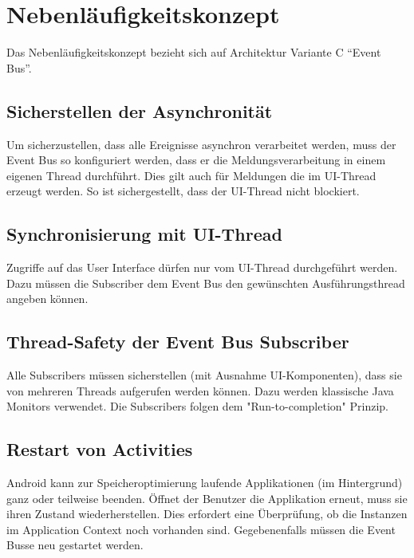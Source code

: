 \section{Nebenläufigkeitskonzept}
\label{sec:Nebenläufigkeitskonzept}
Das Nebenläufigkeitskonzept bezieht sich auf Architektur Variante C \enquote{Event Bus}.

\subsection{Sicherstellen der Asynchronität}
Um sicherzustellen, dass alle Ereignisse asynchron verarbeitet werden, muss der Event Bus so konfiguriert werden, dass er die Meldungsverarbeitung in einem eigenen Thread durchführt. Dies gilt auch für Meldungen die im \ac{UI}-Thread erzeugt werden. So ist sichergestellt, dass der \ac{UI}-Thread nicht blockiert.

\subsection{Synchronisierung mit \ac{UI}-Thread}
Zugriffe auf das User Interface dürfen nur vom UI-Thread durchgeführt werden. Dazu müssen die Subscriber dem Event Bus den gewünschten Ausführungsthread angeben können.

\subsection{Thread-Safety der Event Bus Subscriber}
Alle Subscribers müssen sicherstellen (mit Ausnahme UI-Komponenten), dass sie von mehreren Threads aufgerufen werden können. Dazu werden klassische Java Monitors verwendet. Die Subscribers folgen dem "Run-to-completion" Prinzip.

\subsection{Restart von Activities}
Android kann zur Speicheroptimierung laufende Applikationen (im Hintergrund) ganz oder teilweise beenden. Öffnet der Benutzer die Applikation erneut, muss sie ihren Zustand wiederherstellen. Dies erfordert eine Überprüfung, ob die Instanzen im Application Context noch vorhanden sind. Gegebenenfalls müssen die Event Busse neu gestartet werden.